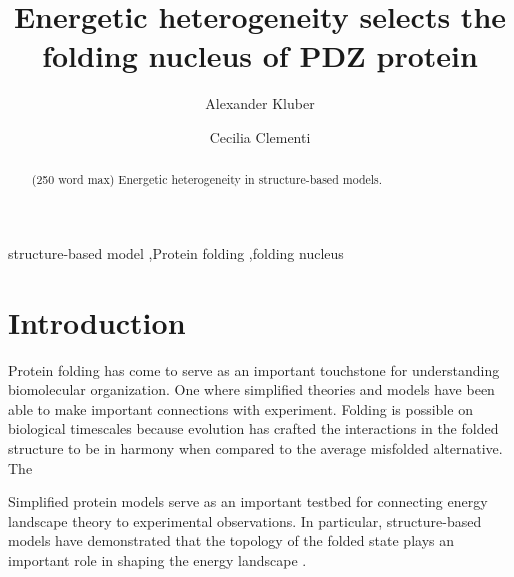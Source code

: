 \documentclass[preprint]{elsarticle}
\begin{document}
\begin{frontmatter}

\title{Energetic heterogeneity selects the folding nucleus of PDZ protein}

\author[6300 Main St. Houston TX, 77005]{Alexander Kluber}

\author[6300 Main St. Houston TX, 77005]{Cecilia Clementi}




\begin{abstract}
(250 word max) Energetic heterogeneity in structure-based models.
\end{abstract}

\begin{keyword}
structure-based model \sep Protein folding \sep folding nucleus
\end{keyword}

\end{frontmatter}


\section{Introduction}

    Protein folding has come to serve as an important touchstone for understanding
biomolecular organization. One where simplified theories and models have been
able to make important connections with experiment. Folding is possible on
biological timescales because evolution has crafted the interactions in the
folded structure to be in harmony when compared to the average misfolded
alternative. The

    Simplified protein models serve as an important testbed for connecting
energy landscape theory to experimental observations. In particular,
structure-based models have demonstrated that the topology of the folded state
plays an important role in shaping the energy landscape \cite{Clementi2000}.
\end{document}
